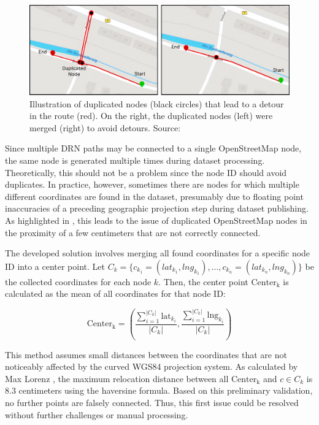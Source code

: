 \begin{figure}[t]
\centering
\includegraphics[width=\linewidth]{images/node-merging.pdf}
\caption{Illustration of duplicated nodes (black circles) that lead to a detour in the route (red). On the right, the duplicated nodes (left) were merged (right) to avoid detours. Source: \cite{lorenz_2022}}
\label{fig:node-merging}
\end{figure}

Since multiple DRN paths may be connected to a single OpenStreetMap node, the same node is generated multiple times during dataset processing. Theoretically, this should not be a problem since the node ID should avoid duplicates. In practice, however, sometimes there are nodes for which multiple different coordinates are found in the dataset, presumably due to floating point inaccuracies of a preceding geographic projection step during dataset publishing. As highlighted in , this leads to the issue of duplicated OpenStreetMap nodes in the proximity of a few centimeters that are not correctly connected.

The developed solution involves merging all found coordinates for a specific node ID into a center point. Let $C_k = \{c_{k_1} = (lat_{k_1}, lng_{k_1}), \text{...} , c_{k_n} = (lat_{k_n}, lng_{k_n})\}$ be the collected coordinates for each node $k$. Then, the center point $\text{Center}_{\text{k}}$ is calculated as the mean of all coordinates for that node ID:

\begin{equation}\text{Center}_{\text{k}} = \left(\frac{\sum_{i=1}^{|C_k|} \text{{lat}}_{k_i}}{|C_k|}, \frac{\sum_{i=1}^{|C_k|} \text{{lng}}_{k_i}}{|C_k|}\right)\end{equation}

This method assumes small distances between the coordinates that are not noticeably affected by the curved WGS84 projection system. As calculated by Max Lorenz \cite{lorenz_2022}, the maximum relocation distance between all $\text{Center}_{\text{k}}$ and $c \in C_k$ is 8.3 centimeters using the haversine formula. Based on this preliminary validation, no further points are falsely connected. Thus, this first issue could be resolved without further challenges or manual processing.

